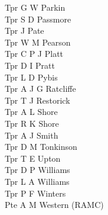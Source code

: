 \begin{multicols}{3}
  Tpr G W Parkin \\
  Tpr S D Passmore \\
  Tpr J Pate \\
  Tpr W M Pearson \\
  Tpr C P J Platt \\
  Tpr D I Pratt \\
  Tpr L D Pybis \\
  Tpr A J G Ratcliffe \\
  Tpr T J Restorick \\
  Tpr A L Shore \\
  Tpr R K Shore \\
  Tpr A J Smith \\
  Tpr D M Tonkinson \\
  Tpr T E Upton \\
  Tpr D P Williams \\
  Tpr L A Williams \\
  Tpr P F Winters \\
  Pte A M Western (RAMC)
\end{multicols}

\pagebreak
